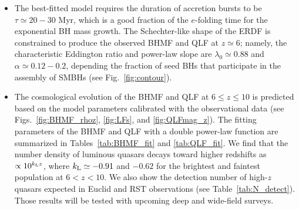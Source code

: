 \documentclass[twocolumn, twocolappendix]{aastex63}
\newcommand{\Muv}{M_{1450}}
\begin{document}
\begin{CJK*}{UTF8}{gbsn}
\begin{itemize}
\item
The best-fitted model requires the duration of accretion bursts to be $\tau \simeq 20-30$ Myr,
which is a good fraction of the $e$-folding time for the exponential BH mass growth.
The Schechter-like shape of the ERDF is constrained to produce the observed BHMF and QLF at $z\simeq 6$; namely,
the characteristic Eddington ratio and power-law slope are $\lambda_0 \simeq 0.88$ and $\alpha \simeq 0.12-0.2$,
depending the fraction of seed BHs that participate in the assembly of SMBHs (see Fig.~\ref{fig:contour}).

\item
The cosmological evolution of the BHMF and QLF at $6\leq z \leq 10$ is predicted based on the model parameters
calibrated with the observational data (see Figs.~\ref{fig:BHMF_rhoz}, \ref{fig:LFs}, and \ref{fig:QLFmag_z}).
The fitting parameters of the BHMF and QLF with a double power-law function are summarized in Tables~\ref{tab:BHMF_fit} and \ref{tab:QLF_fit}.
We find that the number density of luminous quasars decays toward higher redshifts as $\propto 10^{k_{\rm L} z}$,
where $k_{\rm L}\simeq -0.91$ and $-0.62$ for the brightest and faintest population at $6<z<10$.
We also show the detection number of high-$z$ quasars expected in Euclid and RST observations (see Table~\ref{tab:N_detect}).
Those results will be tested with upcoming deep and wide-field surveys.




\end{itemize}
\end{CJK*}
\end{document}
